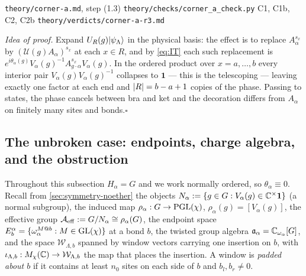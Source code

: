 %
{\texttt{theory/corner-a.md}, step (1.3)}%
{\texttt{theory/checks/corner\_a\_check.py} C1, C1b, C2, C2b}%
{\texttt{theory/verdicts/corner-a-r3.md}}

\smallskip\noindent\textit{Idea of proof.}
Expand $U_R(g)|\psi_\Lambda\rangle$ in the physical basis: the effect is to replace
$A_\alpha^{s_x}$ by $(\mathcal{U}(g)A_\alpha)^{s_x}$ at each $x\in R$, and by
\cref{eq:IT} each such replacement is
$e^{i\theta_\alpha(g)}V_\alpha(g)^{-1}A_{g\cdot\alpha}^{s_x}V_\alpha(g)$.  In the
ordered product over $x=a,\dots,b$ every interior pair
$V_\alpha(g)V_\alpha(g)^{-1}$ collapses to $\mathbf{1}$ --- this is the
telescoping --- leaving exactly one factor at each end and $\lvert R\rvert=b-a+1$
copies of the phase.  Passing to states, the phase cancels between bra and ket
and the decoration differs from $A_\alpha$ on finitely many sites and
bonds.\hfill$\square$

\subsection{The unbroken case: endpoints, charge algebra, and the obstruction}

Throughout this subsection $H_\alpha=G$ and we work normally ordered, so
$\theta_\alpha\equiv0$.  Recall from \cref{sec:symmetry-noether} the objects
$N_\alpha:=\{g\in G: V_\alpha(g)\in\mathbb{C}^\times\mathbf{1}\}$ (a normal subgroup),
the induced map $\rho_\alpha:G\to\operatorname{PGL}(\chi)$, $\rho_\alpha(g)=[V_\alpha(g)]$, the
effective group $\mathcal{A}_{\mathrm{eff}}:=G/N_\alpha\cong\rho_\alpha(G)$, the endpoint space
$E^\alpha_b=\{\omega_\alpha^{M@b}: M\in\operatorname{GL}(\chi)\}$ at a bond $b$, the twisted
group algebra $\mathfrak{a}_\alpha=\mathbb{C}_{\omega_\alpha}[G]$, and the space
$\mathcal{W}_{\Lambda,b}$ spanned by window vectors carrying one insertion on
$b$, with $\iota_{\Lambda,b}:M_\chi(\mathbb{C})\to\mathcal{W}_{\Lambda,b}$ the map that
places the insertion.  A window is \emph{padded about $b$} if it contains at
least $n_0$ sites on each side of $b$ and $b_l,b_r\neq0$.

